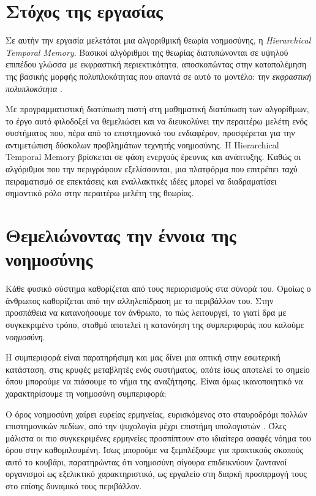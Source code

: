 \section{Στόχος της εργασίας}

  Σε αυτήν την εργασία μελετάται μια αλγοριθμική θεωρία νοημοσύνης, η \textit{Hierarchical Temporal Memory}.
  Βασικοί αλγόριθμοι της θεωρίας διατυπώνονται σε υψηλού επιπέδου γλώσσα με εκφραστική περιεκτικότητα,
  αποσκοπώντας στην καταπολέμηση της βασικής μορφής πολυπλοκότητας που απαντά σε αυτό το μοντέλο:
  την \textit{εκφραστική πολυπλοκότητα} \parencite{chazelleNaturalAlgorithmsInfluence}.

  Με προγραμματιστική διατύπωση πιστή στη μαθηματική διατύπωση των αλγορίθμων, το έργο αυτό φιλοδοξεί να θεμελιώσει και να
  διευκολύνει την περαιτέρω μελέτη ενός συστήματος που, πέρα από το επιστημονικό του ενδιαφέρον,
  προσφέρεται για την αντιμετώπιση δύσκολων προβλημάτων τεχνητής νοημοσύνης.
  Η Hierarchical Temporal Memory βρίσκεται σε φάση ενεργούς έρευνας και ανάπτυξης.
  Καθώς οι αλγόριθμοι που την περιγράφουν εξελίσσονται, μια πλατφόρμα που επιτρέπει ταχύ πειραματισμό σε επεκτάσεις και εναλλακτικές ιδέες
  μπορεί να διαδραματίσει σημαντικό ρόλο στην περαιτέρω μελέτη της θεωρίας.

\section{Θεμελιώνοντας την έννοια της νοημοσύνης}

  Κάθε φυσικό σύστημα καθορίζεται από τους περιορισμούς στα σύνορά του.
  Ομοίως ο άνθρωπος καθορίζεται από την αλληλεπίδραση με το περιβάλλον του.
  Στην προσπάθεια να κατανοήσουμε τον άνθρωπο, το πώς λειτουργεί, το γιατί δρα με συγκεκριμένο τρόπο,
  σταθμό αποτελεί η κατανόηση της συμπεριφοράς που καλούμε \textit{νοημοσύνη}.

  Η συμπεριφορά είναι παρατηρήσιμη και μας δίνει μια οπτική στην εσωτερική κατάσταση, στις κρυφές μεταβλητές ενός συστήματος,
  οπότε ίσως αποτελεί το σημείο όπου μπορούμε να πιάσουμε το νήμα της αναζήτησης.
  Είναι όμως ικανοποιητικό να χαρακτηρίσουμε τη νοημοσύνη συμπεριφορά;

  Ο όρος νοημοσύνη χαίρει ευρείας ερμηνείας, ευρισκόμενος στο σταυροδρόμι πολλών επιστημονικών πεδίων, από την ψυχολογία μέχρι επιστήμη υπολογιστών
  \parencite{leggCollectionDefinitionsIntelligence2007}.
  Όλες μάλιστα οι πιο συγκεκριμένες ερμηνείες προσπίπτουν στο ιδιαίτερα ασαφές νόημα του όρου στην καθομιλουμένη.
  Ίσως μπορούμε να ξεμπλέξουμε για πρακτικούς σκοπούς αυτό το κουβάρι, παρατηρώντας ότι νοημοσύνη σίγουρα επιδεικνύουν ζωντανοί οργανισμοί ως εξελικτικό χαρακτηριστικό,
  ως εργαλείο στη διαρκή προσαρμογή τους στο επίσης δυναμικό τους περιβάλλον.

